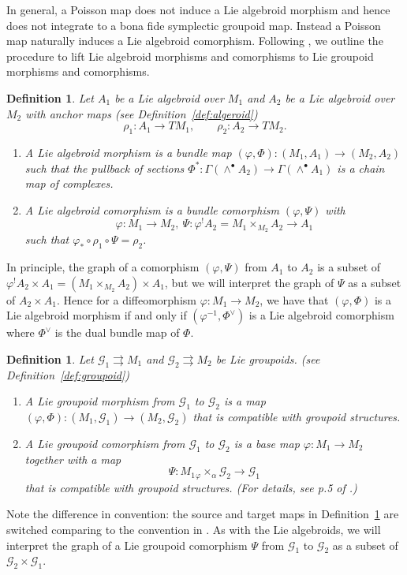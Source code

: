 \documentclass{amsart}
\newtheorem{definition}[theorem]{Definition}
\newtheorem{remark}[theorem]{Remark}
\numberwithin{equation}{section}
\newcommand{\cG}{\mathcal{G}}
\newcommand{\rra}{\rightrightarrows}
\begin{document}

In general, a Poisson map does not induce a Lie algebroid morphism and hence does not integrate to a bona fide symplectic groupoid map.
Instead a Poisson map naturally induces a Lie algebroid comorphism.
Following \cite{CDW13}, we outline the procedure to lift Lie algebroid morphisms and comorphisms to Lie groupoid morphisms and comorphisms.
\begin{definition} 
  \cite{HM90, Mac05, CDW13}
 	Let $A_1$ be a Lie algebroid over $M_1$ and $A_2$ be a Lie algebroid over $M_2$ with anchor maps (see Definition~\ref{def:algeroid})
 	\[ \rho_1: A_1 \to TM_1, \qquad \rho_2: A_2 \to TM_2. \]
 	\begin{enumerate}
 		\item A Lie algebroid morphism is a bundle map $(\varphi, \Phi): (M_1, A_1) \to (M_2, A_2)$ such that the pullback of sections $\Phi^*: \Gamma(\wedge^\bullet A_2) \to \Gamma(\wedge^\bullet A_1)$ is a chain map of complexes.
 		\item A Lie algebroid comorphism is a bundle comorphism $(\varphi, \Psi)$ with
 			\[ \varphi: M_1 \to M_2,~ \Psi: \varphi^! A_2 = M_1 {\times_{M_2}} A_2 \to A_1 \]
 			such that $\varphi_* \circ \rho_1 \circ \Psi = \rho_2$. 
 	\end{enumerate}
\end{definition}
In principle, the graph of a comorphism $(\varphi, \Psi)$ from $A_1$ to $A_2$ is a subset of $\varphi^! A_2 \times A_1 = \left(M_1 {\times_{M_2}} A_2 \right) \times A_1$, but we will interpret the graph of $\Psi$ as a subset of $A_2 \times A_1$. Hence for a diffeomorphism $\varphi: M_1 \to M_2$, we have that $(\varphi, \Phi)$ is a Lie algebroid morphism if and only if $(\varphi^{-1}, \Phi^\vee)$ is a Lie algebroid comorphism where $\Phi^\vee$ is the dual bundle map of $\Phi$.
\begin{definition} \cite{Mac05, CDW13} \label{def:gpdcomor}
	Let $\cG_1 \rra M_1$ and $\cG_2 \rra M_2$ be Lie groupoids. (see Definition~\ref{def:groupoid})
	\begin{enumerate}
 		\item A Lie groupoid morphism from $\cG_1$ to $\cG_2$ is a map $(\varphi, \Phi): (M_1, \cG_1) \to (M_2, \cG_2)$ that is compatible with groupoid structures. 
 		\item A Lie groupoid comorphism from $\cG_1$ to $\cG_2$ is a base map $\varphi: M_1 \to M_2$ together with a map
 			\[ \Psi: M_1 {_\varphi \times_\alpha} \cG_2 \to \cG_1 \]
 		that is compatible with groupoid structures. (For details, see p.5 of \cite{CDW13}.) 
 	\end{enumerate}
\end{definition}
Note the difference in convention: the source and target maps in Definition~\ref{def:gpdcomor} are switched comparing to the convention in \cite{CDW13}.
As with the Lie algebroids, we will interpret the graph of a Lie groupoid comorphism $\Psi$ from $\cG_1$ to $\cG_2$ as a subset of $\cG_2 \times \cG_1$.
\end{document}

